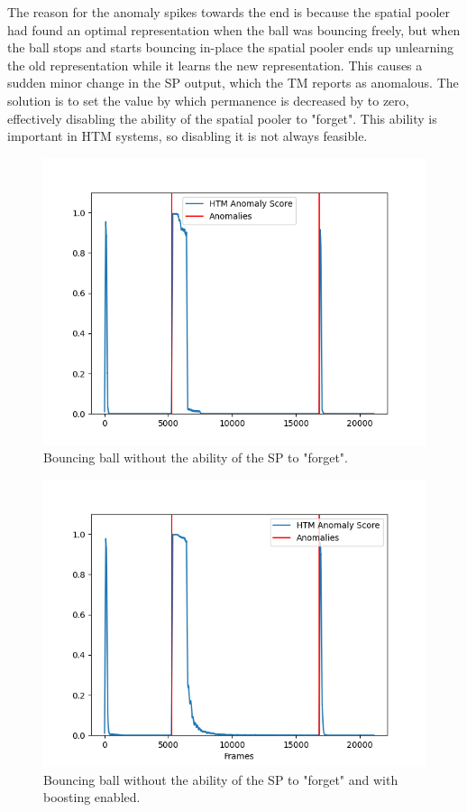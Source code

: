 The reason for the anomaly spikes towards the end is because the spatial pooler had found an optimal representation when the ball was bouncing freely, but when the ball stops and starts bouncing in-place the spatial pooler ends up unlearning the old representation while it learns the new representation. This causes a sudden minor change in the SP output, which the TM reports as anomalous. The solution is to set the value by which permanence is decreased by to zero, effectively disabling the ability of the spatial pooler to "forget". This ability is important in HTM systems, so disabling it is not always feasible.
\begin{figure}[H]
    \centering
    \includegraphics[width=\textwidth]{resources/experiments/bouncing_ball/bb_anoms_unforgetting.png}
    \caption{Bouncing ball without the ability of the SP to "forget".}
\end{figure}
\begin{figure}[H]
    \centering
    \includegraphics[width=\textwidth]{resources/experiments/bouncing_ball/bb_anoms_unforgetting_boosting.png}
    \caption{Bouncing ball without the ability of the SP to "forget" and with boosting enabled.}
\end{figure}
